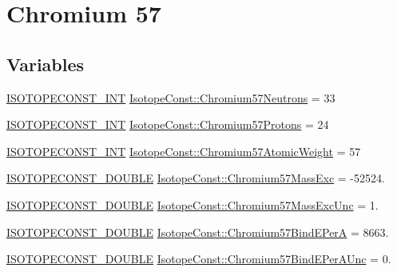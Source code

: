 \hypertarget{group___isotope_const-_chromium-_cr57}{}\section{Chromium 57}
\label{group___isotope_const-_chromium-_cr57}
\subsection*{Variables}
\begin{DoxyCompactItemize}
\item 
\mbox{\hyperlink{group___isotope_const-_macros_ga5f18360b3e99483a35c32d789e62621c}{I\+S\+O\+T\+O\+P\+E\+C\+O\+N\+S\+T\+\_\+\+I\+NT}} \mbox{\hyperlink{group___isotope_const-_chromium-_cr57_ga42ac9110bef82c57ed1e1b64e29bc191}{Isotope\+Const\+::\+Chromium57\+Neutrons}} = 33
\item 
\mbox{\hyperlink{group___isotope_const-_macros_ga5f18360b3e99483a35c32d789e62621c}{I\+S\+O\+T\+O\+P\+E\+C\+O\+N\+S\+T\+\_\+\+I\+NT}} \mbox{\hyperlink{group___isotope_const-_chromium-_cr57_gadda9fd6f02dfc46340f8f8b3a61bbcaa}{Isotope\+Const\+::\+Chromium57\+Protons}} = 24
\item 
\mbox{\hyperlink{group___isotope_const-_macros_ga5f18360b3e99483a35c32d789e62621c}{I\+S\+O\+T\+O\+P\+E\+C\+O\+N\+S\+T\+\_\+\+I\+NT}} \mbox{\hyperlink{group___isotope_const-_chromium-_cr57_ga5bcec77ae65b869db7bf51a519bcdec7}{Isotope\+Const\+::\+Chromium57\+Atomic\+Weight}} = 57
\item 
\mbox{\hyperlink{group___isotope_const-_macros_ga8f45a7272ce02c0b4c65c44636ed719a}{I\+S\+O\+T\+O\+P\+E\+C\+O\+N\+S\+T\+\_\+\+D\+O\+U\+B\+LE}} \mbox{\hyperlink{group___isotope_const-_chromium-_cr57_ga9b7cb21fc04ce8d3d9797975cf0785dd}{Isotope\+Const\+::\+Chromium57\+Mass\+Exc}} = -\/52524.
\item 
\mbox{\hyperlink{group___isotope_const-_macros_ga8f45a7272ce02c0b4c65c44636ed719a}{I\+S\+O\+T\+O\+P\+E\+C\+O\+N\+S\+T\+\_\+\+D\+O\+U\+B\+LE}} \mbox{\hyperlink{group___isotope_const-_chromium-_cr57_ga927be74cd2d413a0cb48269a2cf3282c}{Isotope\+Const\+::\+Chromium57\+Mass\+Exc\+Unc}} = 1.
\item 
\mbox{\hyperlink{group___isotope_const-_macros_ga8f45a7272ce02c0b4c65c44636ed719a}{I\+S\+O\+T\+O\+P\+E\+C\+O\+N\+S\+T\+\_\+\+D\+O\+U\+B\+LE}} \mbox{\hyperlink{group___isotope_const-_chromium-_cr57_ga13c97a0852992afda3469489e54ba33a}{Isotope\+Const\+::\+Chromium57\+Bind\+E\+PerA}} = 8663.
\item 
\mbox{\hyperlink{group___isotope_const-_macros_ga8f45a7272ce02c0b4c65c44636ed719a}{I\+S\+O\+T\+O\+P\+E\+C\+O\+N\+S\+T\+\_\+\+D\+O\+U\+B\+LE}} \mbox{\hyperlink{group___isotope_const-_chromium-_cr57_ga898a9631dc380c7188d3f879dea5fc9f}{Isotope\+Const\+::\+Chromium57\+Bind\+E\+Per\+A\+Unc}} = 0.

\end{DoxyCompactItemize}
